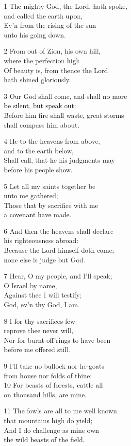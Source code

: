 \begin{multicols}{3}
1 The mighty God, the Lord, hath spoke,\\
and called the earth upon,\\
Ev’n from the rising of the sun\\
unto his going down.

2 From out of Zion, his own hill,\\
where the perfection high\\
Of beauty is, from thence the Lord\\
hath shined gloriously.

3 Our God shall come, and shall no more\\
be silent, but speak out:\\
Before him fire shall waste, great storms\\
shall compass him about.

4 He to the heavens from above,\\
and to the earth below,\\
Shall call, that he his judgments may\\
before his people show.

5 Let all my saints together be\\
unto me gathered;\\
Those that by sacrifice with me\\
a covenant have made.

6 And then the heavens shall declare\\
his righteousness abroad:\\
Because the Lord himself doth come;\\
none else is judge but God.

7 Hear, O my people, and I’ll speak;\\
O Israel by name,\\
Against thee I will testify;\\
God, ev’n thy God, I am.

8 I for thy sacrifices few\\
reprove thee never will,\\
Nor for burnt-off’rings to have been\\
before me offered still.

9 I’ll take no bullock nor he-goats\\
from house nor folds of thine:\\
10 For beasts of forests, cattle all\\
on thousand hills, are mine.

11 The fowls are all to me well known\\
that mountains high do yield;\\
And I do challenge as mine own\\
the wild beasts of the field.


\end{multicols}
